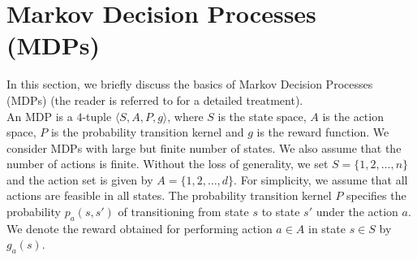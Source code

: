 \chapter{Markov Decision Processes (MDPs)}
In this section, we briefly discuss the basics of Markov Decision Processes (MDPs) (the reader is referred to \cite{BertB,Puter} for a detailed treatment).\\
An MDP is a $4$-tuple $\langle S,A,P,g\rangle$, where $S$ is the state space, $A$ is the action space, $P$ is the probability transition kernel and $g$ is the reward function. We consider MDPs with large but finite number of states. We also assume that the number of actions is finite.
Without the loss of generality, we set  $S=\{1,2,\ldots,n\}$  and the action set is given by $A=\{1,2,\ldots,d\}$. For simplicity, we assume that all actions are feasible in all states. The probability transition kernel $P$ specifies the probability $p_a(s,s')$ of transitioning from state $s$ to state $s'$ under the action $a$. We denote the reward obtained for performing action $a\in A$ in state $s\in S$ by $g_a(s)$.

